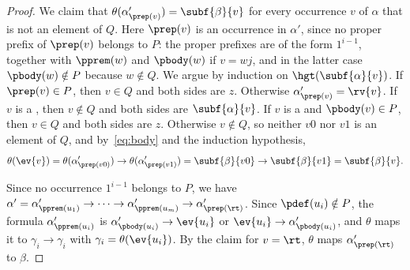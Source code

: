 \begin{proof}
We claim that $\theta(\alpha'_{\prep(v)})=\subf{\beta}{v}$ for every
occurrence $v$ of $\alpha$ that is not  an element of
$Q$. Here $\prep(v)$ is an occurrence in $\alpha'$, since no proper prefix
of $\prep(v)$ belongs to $P$: the proper prefixes are of the form
$1^{i-1}$, together with $\pprem(w)$ and $\pbody(w)$ if $v=wj$, and in
the latter case $\pbody(w)\notin P$ because $w\notin Q$. We argue by
induction on $\hgt(\subf{\alpha}{v})$. If $\prep(v)\in P$, then $v\in Q$
and both sides are $z$. Otherwise $\alpha'_{\prep(v)}=\rv{v}$. If $v$ is a
, then $v\notin Q$ and both sides are $\subf{\alpha}{v}$. If $v$
is a  and $\pbody(v)\in P$, then $v\in Q$ and
both sides are $z$. Otherwise $v\notin Q$, so neither $v0$ nor $v1$ is
 an element of $Q$, and by~\eqref{eq:body} and the
induction hypothesis,
\[
\theta(\ev{v})=\theta(\alpha'_{\prep(v0)})\to\theta(\alpha'_{\prep(v1)})
=\subf{\beta}{v0}\to\subf{\beta}{v1}=\subf{\beta}{v}.
\]

Since no occurrence $1^{i-1}$ belongs to $P$, we have
$\alpha'=\alpha'_{\pprem(u_1)}\to\dots\to\alpha'_{\pprem(u_m)}\to
\alpha'_{\prep(\rt)}$. Since $\pdef(u_i)\notin P$, the formula
$\alpha'_{\pprem(u_i)}$ is $\alpha'_{\pbody(u_i)}\to\ev{u_i}$ or
$\ev{u_i}\to\alpha'_{\pbody(u_i)}$, and $\theta$ maps it to
$\gamma_i\to\gamma_i$ with $\gamma_i=\theta(\ev{u_i})$. By the claim for
$v=\rt$, $\theta$ maps $\alpha'_{\prep(\rt)}$ to $\beta$.
\end{proof}

